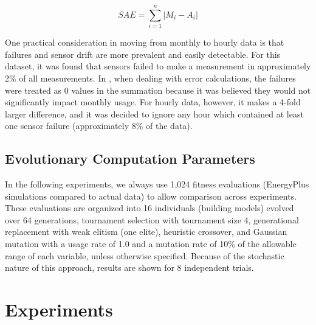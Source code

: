 \documentclass[preprint, review, 12pt]{elsarticle}
\begin{document}
\begin{equation}
\label{eq:sae}
	SAE = \sum_{i=1}^{n}\left|M_i - A_i\right|
\end{equation}

One practical consideration in moving from monthly to hourly data is that failures and sensor drift are more prevalent and easily detectable. For this dataset, it was found that sensors failed to make a measurement in approximately 2\% of all measurements. In \cite{cit:garrett2013}, when dealing with error calculations, the failures were treated as 0 values in the summation because it was believed they would not significantly impact monthly usage. For hourly data, however, it makes a 4-fold larger difference, and it was decided to ignore any hour which contained at least one sensor failure (approximately 8\% of the data).

\subsection{Evolutionary Computation Parameters}
In the following experiments, we always use 1,024 fitness evaluations (EnergyPlus simulations compared to actual data) to allow comparison across experiments. These evaluations are organized into 16 individuals (building models) evolved over 64 generations, tournament selection with tournament size 4, generational replacement with weak elitism (one elite), heuristic crossover, and Gaussian mutation with a usage rate of 1.0 and a mutation rate of 10\% of the allowable range of each variable, unless otherwise specified. Because of the stochastic nature of this approach, results are shown for 8 independent trials.



\section{Experiments}
\label{sec:hourly}
\end{document}
